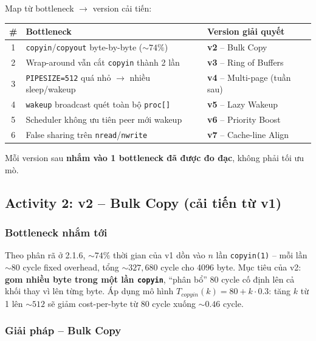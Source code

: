 \documentclass[11pt,a4paper]{article}
\begin{document}
Map từ bottleneck $\rightarrow$ version cải tiến:

\begin{center}
\begin{tabularx}{0.95\linewidth}{cXl}
\toprule
\textbf{\#} & \textbf{Bottleneck} & \textbf{Version giải quyết} \\
\midrule
1 & \texttt{copyin}/\texttt{copyout} byte-by-byte ($\sim 74\%$) & \textbf{v2} -- Bulk Copy \\
2 & Wrap-around vẫn cắt \texttt{copyin} thành 2 lần & \textbf{v3} -- Ring of Buffers \\
3 & \texttt{PIPESIZE=512} quá nhỏ $\rightarrow$ nhiều sleep/wakeup & \textbf{v4} -- Multi-page (tuần sau) \\
4 & \texttt{wakeup} broadcast quét toàn bộ \texttt{proc[]} & \textbf{v5} -- Lazy Wakeup \\
5 & Scheduler không ưu tiên peer mới wakeup & \textbf{v6} -- Priority Boost \\
6 & False sharing trên \texttt{nread}/\texttt{nwrite} & \textbf{v7} -- Cache-line Align \\
\bottomrule
\end{tabularx}
\end{center}

Mỗi version sau \textbf{nhắm vào 1 bottleneck đã được đo đạc}, không phải tối ưu mò.

\subsection{Activity 2: v2 -- Bulk Copy (cải tiến từ v1)}

\subsubsection{Bottleneck nhắm tới}
Theo phân rã ở 2.1.6, $\sim 74\%$ thời gian của v1 dồn vào $n$ lần \texttt{copyin(1)} -- mỗi lần $\sim 80$ cycle fixed overhead, tổng $\sim 327{,}680$ cycle cho 4096 byte. Mục tiêu của v2: \textbf{gom nhiều byte trong một lần \texttt{copyin}}, ``phân bổ'' 80 cycle cố định lên cả khối thay vì lên từng byte. Áp dụng mô hình $T_{copyin}(k) = 80 + k \cdot 0.3$: tăng $k$ từ 1 lên $\sim 512$ sẽ giảm cost-per-byte từ 80 cycle xuống $\sim 0.46$ cycle.

\subsubsection{Giải pháp -- Bulk Copy}
\end{document}
